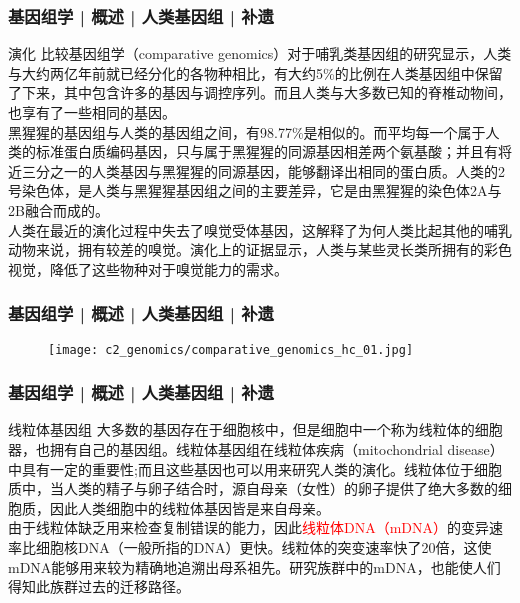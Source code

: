 \begin{frame}
  \frametitle{基因组学 | 概述 | 人类基因组 | 补遗}
  \begin{block}{演化}
比较基因组学（comparative genomics）对于哺乳类基因组的研究显示，人类与大约两亿年前就已经分化的各物种相比，有大约5\%的比例在人类基因组中保留了下来，其中包含许多的基因与调控序列。而且人类与大多数已知的脊椎动物间，也享有了一些相同的基因。\\
 \vspace{1em}
黑猩猩的基因组与人类的基因组之间，有98.77\%是相似的。而平均每一个属于人类的标准蛋白质编码基因，只与属于黑猩猩的同源基因相差两个氨基酸；并且有将近三分之一的人类基因与黑猩猩的同源基因，能够翻译出相同的蛋白质。人类的2号染色体，是人类与黑猩猩基因组之间的主要差异，它是由黑猩猩的染色体2A与2B融合而成的。\\
 \vspace{1em}
人类在最近的演化过程中失去了嗅觉受体基因，这解释了为何人类比起其他的哺乳动物来说，拥有较差的嗅觉。演化上的证据显示，人类与某些灵长类所拥有的彩色视觉，降低了这些物种对于嗅觉能力的需求。
  \end{block}
\end{frame}

\begin{frame}
  \frametitle{基因组学 | 概述 | 人类基因组 | 补遗}
  \begin{figure}
    \centering
    \texttt{[image: c2\_genomics/comparative\_genomics\_hc\_01.jpg]}
  \end{figure}
\end{frame}

\begin{frame}
  \frametitle{基因组学 | 概述 | 人类基因组 | 补遗}
  \begin{block}{线粒体基因组}
大多数的基因存在于细胞核中，但是细胞中一个称为线粒体的细胞器，也拥有自己的基因组。线粒体基因组在线粒体疾病（mitochondrial disease）中具有一定的重要性;而且这些基因也可以用来研究人类的演化。线粒体位于细胞质中，当人类的精子与卵子结合时，源自母亲（女性）的卵子提供了绝大多数的细胞质，因此人类细胞中的线粒体基因皆是来自母亲。\\
\vspace{1em}
由于线粒体缺乏用来检查复制错误的能力，因此\textcolor{red}{线粒体DNA（mDNA）}的变异速率比细胞核DNA（一般所指的DNA）更快。线粒体的突变速率快了20倍，这使mDNA能够用来较为精确地追溯出母系祖先。研究族群中的mDNA，也能使人们得知此族群过去的迁移路径。
  \end{block}
\end{frame}

